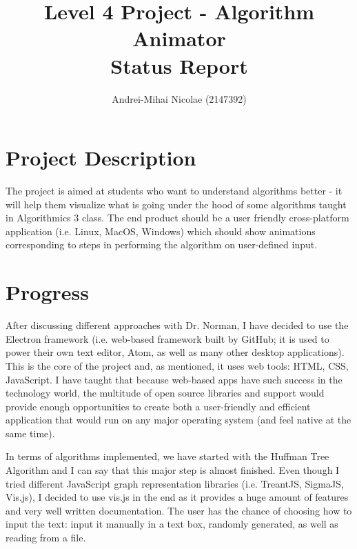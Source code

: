 \documentclass[11pt]{article}
\begin{document}
\posttitle{\end{center}}

\title{Level 4 Project - Algorithm Animator \\ Status Report}
\author{Andrei-Mihai Nicolae (2147392)}

\maketitle

\section{Project Description}
 The project is aimed at students who want to understand algorithms better - it will help them visualize what is going under the hood of some algorithms taught in Algorithmics 3 class. The end product should be a user friendly cross-platform application (i.e. Linux, MacOS, Windows) which should show animations corresponding to steps in performing the algorithm on user-defined input.
 
 \section{Progress}
 After discussing different approaches with Dr. Norman, I have decided to use the Electron framework (i.e. web-based framework built by GitHub; it is used to power their own text editor, Atom, as well as many other desktop applications). This is the core of the project and, as mentioned, it uses web tools: HTML, CSS, JavaScript. I have taught that because web-based apps have such success in the technology world, the multitude of open source libraries and support would provide enough opportunities to create both a user-friendly and efficient application that would run on any major operating system (and feel native at the same time).
 
 In terms of algorithms implemented, we have started with the Huffman Tree Algorithm and I can say that this major step is almost finished. Even though I tried different JavaScript graph representation libraries (i.e. TreantJS, SigmaJS, Vis.js), I decided to use vis.js in the end as it provides a huge amount of features and very well written documentation. The user has the chance of choosing how to input the text: input it manually in a text box, randomly generated, as well as reading from a file. 
 
\end{document}
